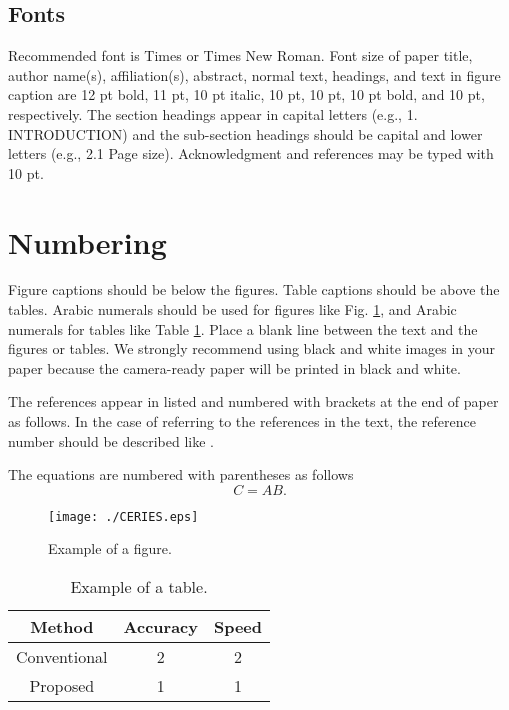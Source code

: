 \documentclass[10pt]{article}
\begin{document}
\subsection{Fonts}

Recommended font is Times or Times New Roman. Font size of
paper title, author name(s), affiliation(s), abstract,
normal text, headings, and text in figure caption are 12 pt
bold, 11 pt, 10 pt italic, 10 pt, 10 pt, 10 pt bold, and 10
pt, respectively. The section headings appear in capital
letters (e.g., 1. INTRODUCTION) and the sub-section headings
should be capital and lower letters (e.g., 2.1 Page
size). Acknowledgment and references may be typed with 10
pt.


\section{Numbering}

Figure captions should be below the figures. Table captions
should be above the tables. Arabic numerals should be used
for figures like Fig. \ref{fig:example}, and Arabic numerals
for tables like Table \ref{tbl:example}. Place a blank line
between the text and the figures or tables. We strongly
recommend using black and white images in your paper
because the camera-ready paper will be printed in black and
white.

The references appear in listed and numbered with brackets
at the end of paper as follows. In the case of referring to
the references in the text, the reference number should be
described like \cite{Himes10}.

The equations are numbered with parentheses as follows
\begin{equation}
  C = AB.
\end{equation}

\begin{figure}[t]
  \centering
  \texttt{[image: ./CERIES.eps]}
  \caption{Example of a figure.}
  \label{fig:example}
\end{figure}

\begin{table}[t]
  \caption{Example of a table.}
  \label{tbl:example}
  \centering
  \begin{tabular}{ccc}
    \hline
    Method & Accuracy & Speed\\
    \hline
    Conventional & 2 & 2\\
    Proposed     & 1 & 1\\
    \hline
  \end{tabular}
\end{table}
\end{document}
